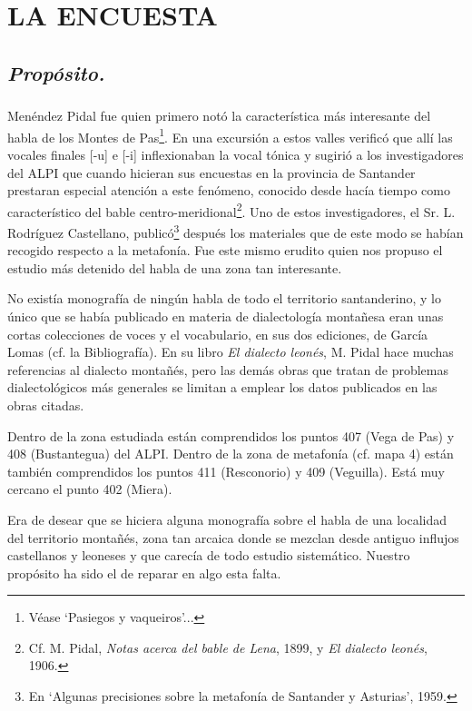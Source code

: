 \chapter{LA ENCUESTA}
\section{\emph{Propósito.}}
\subsection{} Menéndez Pidal fue quien primero notó la característica más interesante del habla de los Montes de Pas\footnote{Véase `Pasiegos y vaqueiros'...}. En una excursión a estos valles verificó que allí las vocales finales [-u] e [-i] inflexionaban la vocal tónica y sugirió a los investigadores del ALPI que cuando hicieran sus encuestas en la provincia de Santander prestaran especial atención a este fenómeno, conocido desde hacía tiempo como característico del bable centro-meridional\footnote{Cf. M. Pidal, \emph{Notas acerca del bable de Lena}, 1899, y \emph{El dialecto leonés}, 1906.}. Uno de estos investigadores, el Sr. L. Rodríguez Castellano, publicó\footnote{En `Algunas precisiones sobre la metafonía de Santander y Asturias', 1959.} después los materiales que de este modo se habían recogido respecto a la metafonía. Fue este mismo erudito quien nos propuso el estudio más detenido del habla de una zona tan interesante.

No existía monografía de ningún habla de todo el territorio santanderino, y lo único que se había publicado en materia de dialectología montañesa eran unas cortas colecciones de voces y el vocabulario, en sus dos ediciones, de García Lomas (cf. la Bibliografía). En su libro \emph{El dialecto leonés}, M. Pidal hace muchas referencias al dialecto montañés, pero las demás obras que tratan de problemas dialectológicos más generales se limitan a emplear los datos publicados en las obras citadas. 

Dentro de la zona estudiada están comprendidos los puntos 407 (Vega de Pas) y 408 (Bustantegua) del ALPI. Dentro de la zona de metafonía (cf. mapa 4) están también comprendidos los puntos 411 (Resconorio) y 409 (Veguilla). Está muy cercano el punto 402 (Miera). 

Era de desear que se hiciera alguna monografía sobre el habla de una localidad del territorio montañés, zona tan arcaica donde se mezclan desde antiguo influjos castellanos y leoneses y que carecía de todo estudio sistemático. Nuestro propósito ha sido el de reparar en algo esta falta. 

